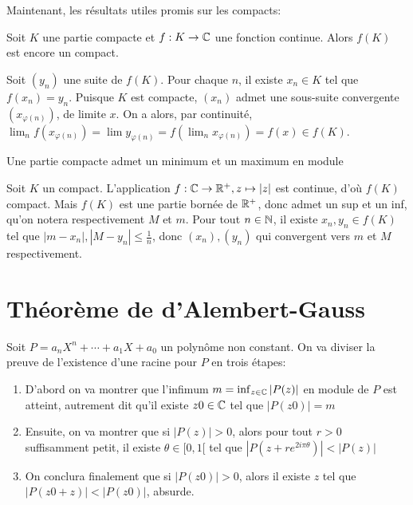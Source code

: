 \documentclass{article}
\begin{document}
Maintenant, les résultats utiles promis sur les compacts:\\
\begin{proposition}
    Soit $K$ une partie compacte et $f: K \to \mathbb{C}$ une fonction continue. Alors $f(K)$ est encore un compact.
\end{proposition}

\begin{preuve}
    Soit $(y_n)$ une suite de $f(K)$. Pour chaque $n$, il existe $x_n \in K$ tel que $f(x_n) = y_n$. Puisque $K$ est compacte, $(x_n)$ admet une sous-suite convergente $(x_{\varphi(n)})$, de limite $x$. On a alors, par continuité, $\lim_n f(x_{\varphi(n)}) = \lim y_{\varphi(n)} = f(\lim_n x_{\varphi(n)}) = f(x) \in f(K)$.
\end{preuve}

\begin{proposition}
    Une partie compacte admet un minimum et un maximum en module
\end{proposition}

\begin{preuve}
    Soit $K$ un compact. L'application $f: \mathbb{C} \to \mathbb{R}^+, z \mapsto |z|$ est continue, d'où $f(K)$ compact. Mais $f(K)$ est une partie bornée de $\mathbb{R}^+$, donc admet un sup et un inf, qu'on notera respectivement $M$ et $m$. Pour tout $n \in \mathbb{N}$, il existe $x_n, y_n \in f(K)$ tel que $|m - x_n|, |M - y_n| \leq \frac{1}{n}$, donc $(x_n), (y_n)$ qui convergent vers $m$ et $M$ respectivement.
\end{preuve}

\section{Théorème de d'Alembert-Gauss}
Soit $P = a_nX^n + \cdots + a_1X + a_0$ un polynôme non constant. On va diviser la preuve de l'existence d'une racine pour $P$ en trois étapes:
\begin{enumerate}
    \item D'abord on va montrer que l'infimum $m = \inf_{z \in \mathbb{C}}{|P(z)|}$ en module de $P$ est atteint, autrement dit qu'il existe $z0 \in \mathbb{C}$ tel que $|P(z0)| = m$
    \item Ensuite, on va montrer que si $|P(z)| > 0$, alors pour tout $r > 0$ suffisamment petit, il existe $\theta \in [0,1[$ tel que $|P(z + r e^{2i\pi\theta})| < |P(z)|$
    \item On conclura finalement que si $|P(z0)| > 0$, alors il existe $z$ tel que $|P(z0+z)| < |P(z0)|$, absurde.
\end{enumerate}
\end{document}

